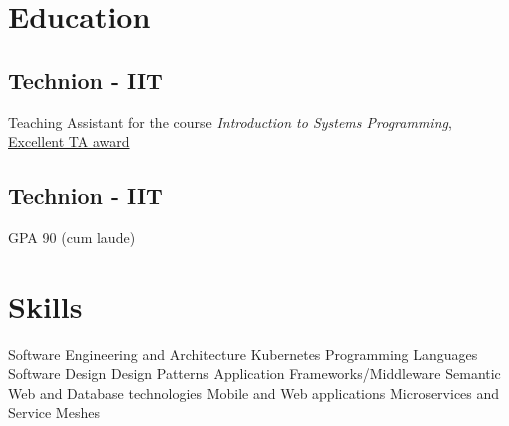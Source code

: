 \documentclass[]{deedy-resume}
\begin{document}
%
%

%
%


%
%

\begin{minipage}[t]{0.33\textwidth}


\section{Education}

\subsection{Technion - IIT}
Teaching Assistant for the course \textit{Introduction to Systems Programming}, \href{https://ugportal.net.technion.ac.il/files/2014/05/horev-tashasa.pdf}{Excellent TA award}
\sectionsep
\subsection{Technion - IIT}
GPA 90 (cum laude)
\sectionsep


\section{Skills}
Software Engineering and Architecture \textbullet{} Kubernetes \textbullet{} Programming Languages \textbullet{} Software Design \textbullet{} Design Patterns \textbullet{} Application Frameworks/Middleware \textbullet{} Semantic Web and Database technologies \textbullet{} Mobile and Web applications \textbullet{} Microservices and Service Meshes
\sectionsep


\end{minipage}
\end{document}
